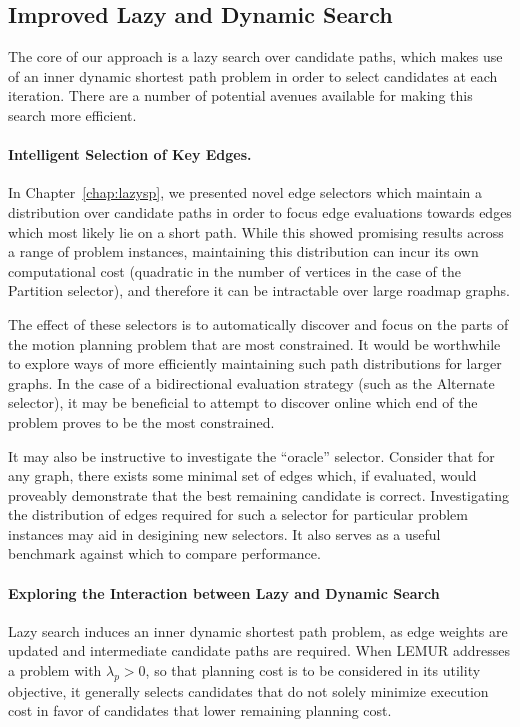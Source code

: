\subsection{Improved Lazy and Dynamic Search}

The core of our approach is a lazy search over candidate paths,
which makes use of an inner dynamic shortest path problem
in order to select candidates at each iteration.
There are a number of potential avenues available for making this
search more efficient.

\paragraph{Intelligent Selection of Key Edges.}
In Chapter~\ref{chap:lazysp},
we presented novel edge selectors which maintain a distribution over
candidate paths
in order to focus edge evaluations towards edges which most likely
lie on a short path.
While this showed promising results across a range of problem instances,
maintaining this distribution can incur its own computational cost
(quadratic in the number of vertices in the case of the Partition
selector),
and therefore it can be intractable over large roadmap graphs.

The effect of these selectors is to automatically discover
and focus on the parts of the motion planning problem that are
most constrained.
It would be worthwhile to explore ways of more efficiently maintaining
such path distributions for larger graphs.
In the case of a bidirectional evaluation strategy
(such as the Alternate selector),
it may be beneficial to attempt to discover online which end
of the problem proves to be the most constrained.

It may also be instructive to investigate the ``oracle'' selector.
Consider that for any graph,
there exists some minimal set of edges which, if evaluated,
would proveably demonstrate that the best remaining candidate is
correct.
Investigating the distribution of edges required for such a selector
for particular problem instances
may aid in desigining new selectors.
It also serves as a useful benchmark against which to compare performance.

\paragraph{Exploring the Interaction between Lazy and Dynamic Search}
Lazy search induces an inner dynamic shortest path problem,
as edge weights are updated and intermediate candidate paths are
required.
When LEMUR addresses a problem with $\lambda_p > 0$,
so that planning cost is to be considered in its utility objective,
it generally selects candidates that do not solely minimize execution cost
in favor of candidates that lower remaining planning cost.

